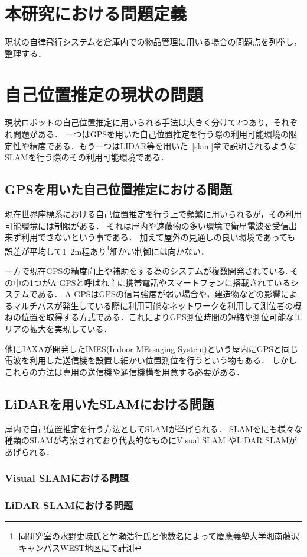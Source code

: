 \section{本研究における問題定義}
現状の自律飛行システムを倉庫内での物品管理に用いる場合の問題点を列挙し，整理する．

\section{自己位置推定の現状の問題}
現状ロボットの自己位置推定に用いられる手法は大きく分けて2つあり，それぞれ問題がある．
一つはGPSを用いた自己位置推定を行う際の利用可能環境の限定性や精度である．もう一つはLIDAR等を用いた~\ref{slam}章で説明されるようなSLAMを行う際のその利用可能環境である．

\subsection{GPSを用いた自己位置推定における問題}
現在世界座標系における自己位置推定を行う上で頻繁に用いられるが，その利用可能環境には制限がある．
それは屋内や遮蔽物の多い環境で衛星電波を受信出来ず利用できないという事である．
加えて屋外の見通しの良い環境であっても誤差が平均して1~2m程あり\footnote{同研究室の水野史暁氏と竹瀬浩行氏と他数名によって慶應義塾大学湘南藤沢キャンパスWEST地区にて計測}細かい制御には向かない．

一方で現在GPSの精度向上や補助をする為のシステムが複数開発されている.
その中の1つがA-GPS\cite{agps}と呼ばれ主に携帯電話やスマートフォンに搭載されているシステムである．
A-GPSはGPSの信号強度が弱い場合や，建造物などの影響によるマルチパスが発生している際に利用可能なネットワークを利用して測位者の概ねの位置を取得する方式である．これによりGPS測位時間の短縮や測位可能なエリアの拡大を実現している．

他にJAXAが開発したIMES(Indoor MEssaging System)\cite{imes}という屋内にGPSと同じ電波を利用した送信機を設置し細かい位置測位を行うという物もある．
しかしこれらの方法は専用の送信機や通信機構を用意する必要がある．


\subsection{LiDARを用いたSLAMにおける問題}
屋内で自己位置推定を行う方法としてSLAMが挙げられる．
SLAMをにも様々な種類のSLAMが考案されており代表的なものにVisual SLAM やLiDAR SLAMがあげられる．

\subsubsection{Visual SLAMにおける問題}

\subsubsection{LiDAR SLAMにおける問題}

